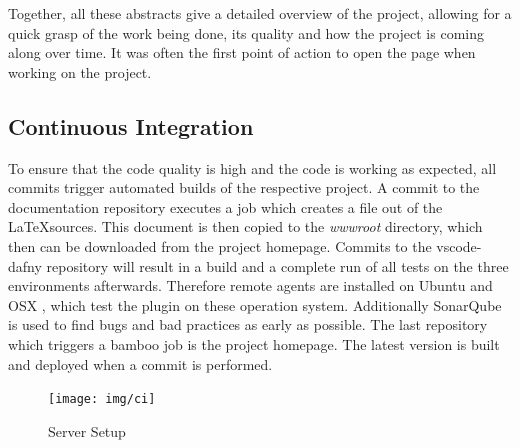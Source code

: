 Together, all these abstracts give a detailed overview of the project, allowing for a quick grasp of the work being done, its quality and how the project is coming along over time. It was often the first point of action to open the page when working on the project. 


\subsection{Continuous Integration}

To ensure that the code quality is high and the code is working as expected, all commits trigger automated builds of the respective project. A commit to the documentation repository executes a job which creates a file out of the \LaTeX sources. This document is then copied to the \emph{wwwroot} directory, which then can be downloaded from the project homepage. Commits to the vscode-dafny repository will result in a build and a complete run of all tests on the three environments afterwards. Therefore remote agents are installed on Ubuntu and OSX , which test the plugin on these operation system.  Additionally SonarQube is used to find bugs and bad practices as early as possible. The last repository which triggers a bamboo job is the project homepage. The latest version is built and deployed when a commit is performed. 


\begin{figure}[H]
	\centering
	\texttt{[image: img/ci]}
	\caption{Server Setup}
	\label{fig:Server setup}
\end{figure}